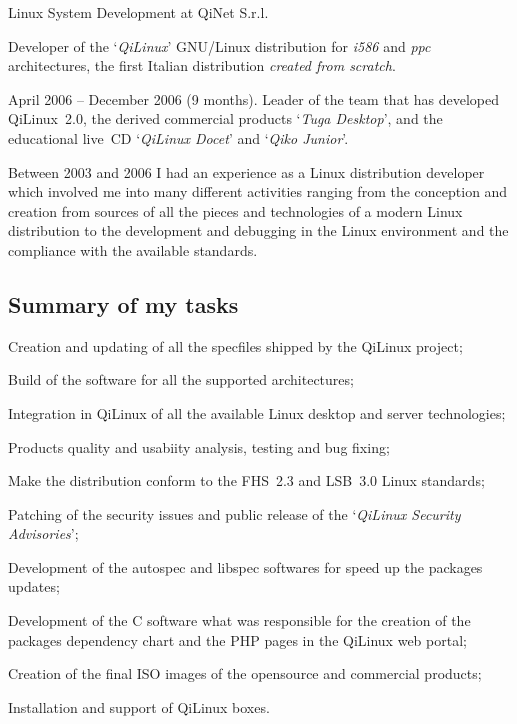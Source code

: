 
\bigskip
{}
   {Linux System Development at QiNet S.r.l.}

\noindent
Developer of the `{\it QiLinux\/}' GNU/Linux distribution for {\it i586} and
{\it ppc} architectures, the first Italian distribution
{\it created from scratch}.

\noindent
April 2006 -- December 2006 (9 months). 
Leader of the team that has developed QiLinux~2.0, the derived commercial 
products `{\it Tuga Desktop\/}', and the educational live~CD 
`{\it QiLinux Docet\/}' and `{\it Qiko Junior\/}'.

Between 2003 and 2006 I had an experience as a Linux distribution developer 
which involved me into many different activities ranging from the conception
and creation from sources of all the pieces and technologies of a modern Linux
distribution to the development and debugging in the Linux environment and 
the compliance with the available standards.

\subsection{Summary of my tasks}

\item{\bdot} Creation and updating of all the specfiles shipped by the QiLinux project;
\item{\bdot} Build of the software for all the supported architectures;
\item{\bdot} Integration in QiLinux of all the available Linux desktop and server technologies;
\item{\bdot} Products quality and usabiity analysis, testing and bug fixing;
\item{\bdot} Make the distribution conform to the FHS~2.3 and LSB~3.0 Linux standards;
\item{\bdot} Patching of the security issues and public release of the 
   `{\it QiLinux Security Advisories\/}';
\item{\bdot} Development of the autospec and libspec softwares for speed up the packages updates;
\item{\bdot} Development of the C software what was responsible for the creation
   of the packages dependency chart and the PHP pages in the QiLinux web portal;
\item{\bdot} Creation of the final ISO images of the opensource and commercial products;
\item{\bdot} Installation and support of QiLinux boxes.

